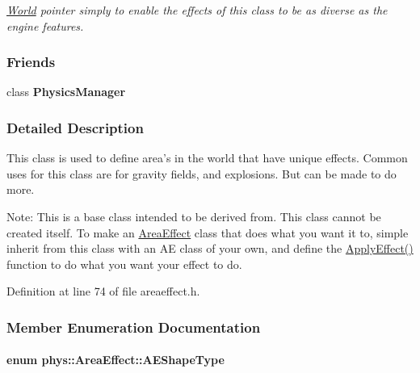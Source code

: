 \begin{DoxyCompactItemize}
\begin{DoxyCompactList}\small\item\em \hyperlink{classphys_1_1World}{World} pointer simply to enable the effects of this class to be as diverse as the engine features. \item\end{DoxyCompactList}\end{DoxyCompactItemize}
\subsubsection*{Friends}
\begin{DoxyCompactItemize}
\item 
\hypertarget{classphys_1_1AreaEffect_a139cf05ac01161b7071c8a037c841683}{
class {\bfseries PhysicsManager}}
\label{classphys_1_1AreaEffect_a139cf05ac01161b7071c8a037c841683}

\end{DoxyCompactItemize}


\subsubsection{Detailed Description}
This class is used to define area's in the world that have unique effects. Common uses for this class are for gravity fields, and explosions. But can be made to do more. \par
 Note: This is a base class intended to be derived from. This class cannot be created itself. To make an \hyperlink{classphys_1_1AreaEffect}{AreaEffect} class that does what you want it to, simple inherit from this class with an AE class of your own, and define the \hyperlink{classphys_1_1AreaEffect_a3b285ecfcf9c9200662d510e48dd222a}{ApplyEffect()} function to do what you want your effect to do. 

Definition at line 74 of file areaeffect.h.



\subsubsection{Member Enumeration Documentation}
\hypertarget{classphys_1_1AreaEffect_a99b8746c43eac266d48ad613110dc6f9}{
\paragraph[{AEShapeType}]{\setlength{\rightskip}{0pt plus 5cm}enum {\bf phys::AreaEffect::AEShapeType}}\hfill}
\label{classphys_1_1AreaEffect_a99b8746c43eac266d48ad613110dc6f9}


